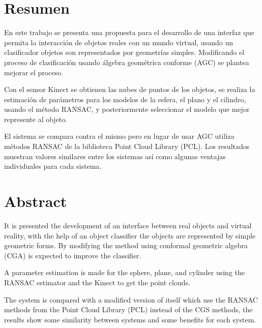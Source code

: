 
\chapter{Resumen}
En este trabajo se presenta una propuesta para el desarrollo de una interfaz que permita la interacción de objetos reales con un mundo virtual, usando un clasificador objetos son representados por geometrías simples. Modificando el proceso de clasificación usando álgebra geométrica conforme (AGC) se plantea mejorar el proceso.


Con el sensor Kinect se obtienen las nubes de puntos de los objetos, se realiza la estimación de parámetros para los modelos de la esfera, el plano y el cilindro, usando el método RANSAC, y posteriormente seleccionar el modelo que mejor represente al objeto.

El sistema se compara contra el mismo pero en lugar de usar AGC utiliza métodos RANSAC de la biblioteca Point Cloud Library (PCL). Los resultados muestran valores similares entre los sistemas así como algunas ventajas individuales para cada sistema.
 

\chapter{Abstract}
It is presented the development of an interface between real objects and virtual reality, with the help of an object classifier the objects are represented by simple geometric forms.  By modifying the method using conformal geometric algebra (CGA) is expected to improve the classifier.

A parameter estimation is made for the sphere, plane, and cylinder using the RANSAC estimator and the Kinect to get the point clouds.

The system is compared with a modified version of itself which use the RANSAC methods from the Point Cloud Library (PCL) instead of the CGS methods, the results show some similarity between systems and some benefits for each system.

